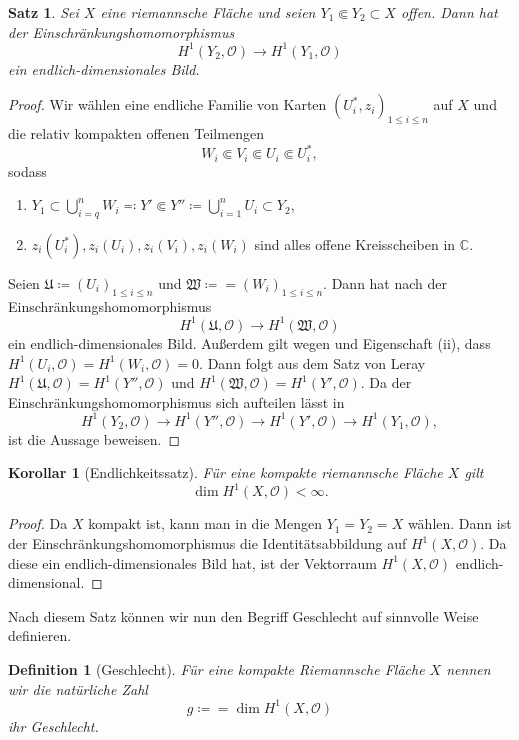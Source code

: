 \documentclass[11pt,a4paper,toc=bibliography]{scrartcl}
\theoremstyle{thm}
\newtheorem{satz}{Satz}[section]
\newtheorem{koro}{Korollar}[section]
\theoremstyle{def}
\newtheorem{defi}{Definition}[section]
\theoremstyle{remark}
\begin{document}
\begin{satz}
Sei $X$ eine riemannsche Fläche und seien $Y_1\Subset Y_2\subset X$ offen. Dann hat der Einschränkungshomomorphismus
\[
H^1(Y_2,\mathcal{O})\rightarrow H^1(Y_1,\mathcal{O})
\]
ein endlich-dimensionales Bild.
\end{satz}
\begin{proof}
Wir wählen eine endliche Familie von Karten $(U_i^*,z_i)_{1\leq i\leq n}$ auf $X$ und die relativ kompakten offenen Teilmengen
\[
W_i\Subset V_i\Subset U_i\Subset U_i^*,
\] 
sodass 
\begin{enumerate}
\item $Y_1\subset \bigcup_{i=q}^n W_i \eqqcolon Y'\Subset Y''\coloneqq \bigcup_{i=1}^n U_i\subset Y_2$,
\item $z_i(U_i^*),z_i(U_i),z_i(V_i),z_i(W_i)$ sind alles offene Kreisscheiben in $\mathbb{C}$.
\end{enumerate}
Seien $\mathfrak{U}\coloneqq (U_i)_{1\leq i\leq n}$ und $\mathfrak{W}\coloneqq = (W_i)_{1\leq i\leq n}$. Dann hat nach  der Einschränkungshomomorphismus
\[
H^1(\mathfrak{U},\mathcal{O})\rightarrow H^1(\mathfrak{W},\mathcal{O})
\]
ein endlich-dimensionales Bild. Außerdem gilt wegen  und Eigenschaft (ii), dass $H^1(U_i,\mathcal{O})=H^1(W_i,\mathcal{O})=0.$ Dann folgt aus dem Satz von Leray $H^1(\mathfrak{U},\mathcal{O})=H^1(Y'',\mathcal{O})$ und $H^1(\mathfrak{W},\mathcal{O})=H^1(Y',\mathcal{O})$. Da der Einschränkungshomomorphismus sich aufteilen lässt in 
\[
H^1(Y_2,\mathcal{O})\rightarrow H^1(Y'',\mathcal{O})\rightarrow H^1(Y',\mathcal{O})\rightarrow H^1(Y_1,\mathcal{O}),
\]
ist die Aussage beweisen.
\end{proof}
\begin{koro}[Endlichkeitssatz]
Für eine kompakte riemannsche Fläche $X$ gilt 
\[
\dim H^1(X,\mathcal{O})<\infty.
\]
\end{koro}
\begin{proof}
Da $X$ kompakt ist, kann man in  die Mengen $Y_1=Y_2=X$ wählen. Dann ist der Einschränkungshomomorphismus die Identitätsabbildung auf $H^1(X,\mathcal{O})$. Da diese ein endlich-dimensionales Bild hat, ist der Vektorraum $H^1(X,\mathcal{O})$ endlich-dimensional.
\end{proof}
Nach diesem Satz können wir nun den Begriff Geschlecht auf sinnvolle Weise definieren.
\begin{defi}[Geschlecht]
	Für eine kompakte Riemannsche Fläche $X$ nennen wir die  natürliche Zahl
	 \[
	 g\coloneqq = \dim H^1(X,\mathcal{O})
	\]
	ihr \emph{Geschlecht}.
\end{defi}
\end{document}
